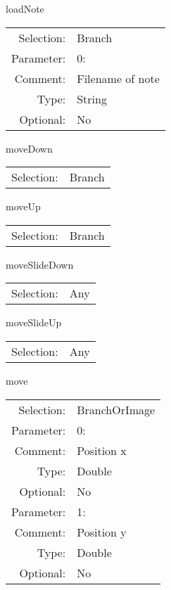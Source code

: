 \item loadNote\\
\begin{tabular}{rl}
  Selection: & Branch\\
   Parameter: &  0:\\
        Comment: & Filename of note\\
           Type: & String\\
       Optional: &  No\\
\end{tabular}

\item moveDown\\
\begin{tabular}{rl}
  Selection: & Branch\\
\end{tabular}

\item moveUp\\
\begin{tabular}{rl}
  Selection: & Branch\\
\end{tabular}

\item moveSlideDown\\
\begin{tabular}{rl}
  Selection: & Any\\
\end{tabular}

\item moveSlideUp\\
\begin{tabular}{rl}
  Selection: & Any\\
\end{tabular}

\item move\\
\begin{tabular}{rl}
  Selection: & BranchOrImage\\
   Parameter: &  0:\\
        Comment: & Position x\\
           Type: & Double\\
       Optional: &  No\\
   Parameter: &  1:\\
        Comment: & Position y\\
           Type: & Double\\
       Optional: &  No\\
\end{tabular}

